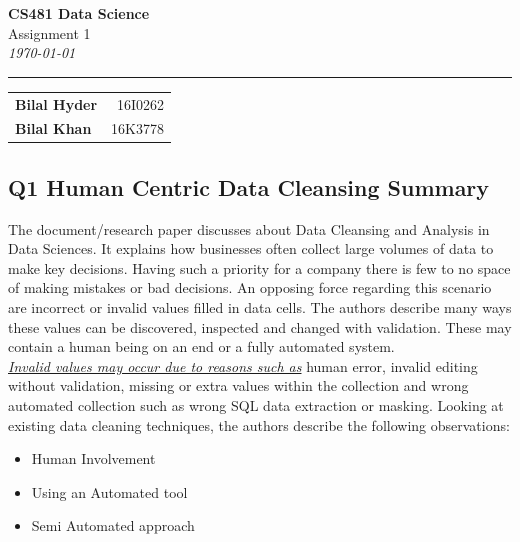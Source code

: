 \documentclass[12pt]{article}
\begin{document}
\begin{flushright}
	\Huge{\textbf{CS481 Data Science}} \\
	\Large{Assignment 1} \\
	\emph{\large{\today}} \\
	\centering \rule{450pt}{1pt}
	\begin{table}[h!]
		\begin{center}
			\begin{tabular}{lr}
				\large{\textbf{Bilal Hyder}} & \large{16I0262} \\
				\large{\textbf{Bilal Khan}} & \large{16K3778}\\
			\end{tabular}
		\end{center}
	\end{table}
\end{flushright}

\subsection*{Q1 Human Centric Data Cleansing Summary}

The document/research paper discusses about Data Cleansing and Analysis in Data Sciences. It explains how businesses often collect large volumes of data to make key decisions. Having such a priority for a company there is few to no space of making mistakes or bad decisions. An opposing force regarding this scenario are incorrect or invalid values filled in data cells. The authors describe many ways these values can be discovered, inspected and changed with validation. These may contain a human being on an end or a fully automated system. \\
\emph{\underline{Invalid values may occur due to reasons such as}} human error, invalid editing without validation, missing or extra values within the collection and wrong automated collection such as wrong SQL data extraction or masking. Looking at existing data cleaning techniques, the authors describe the following observations:

\begin{itemize}
	\item Human Involvement
	\item Using an Automated tool
	\item Semi Automated approach
\end{itemize}
\end{document}
